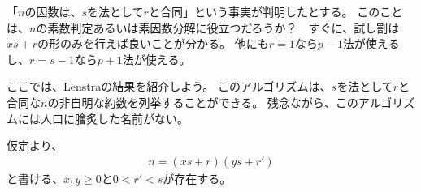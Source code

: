 「$n$の因数は、$s$を法として$r$と合同」という事実が判明したとする。
このことは、$n$の素数判定あるいは素因数分解に役立つだろうか？　すぐに、試し割は$xs+r$の形のみを行えば良いことが分かる。
他にも$r=1$なら$p-1$法が使えるし、$r=s-1$なら$p+1$法が使える。

ここでは、Lenstraの結果\cite{divisors_lenstra}を紹介しよう。
このアルゴリズムは、$s$を法として$r$と合同な$n$の非自明な約数を列挙することができる。
残念ながら、このアルゴリズムには人口に膾炙した名前がない。

仮定より、
\begin{align*}
n = (xs+r)(ys+r')
\end{align*}
と書ける、$x,y\ge0$と$0<r'<s$が存在する。


